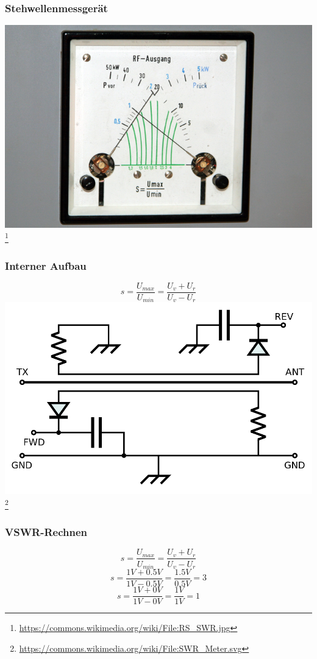 \begin{frame}
    \frametitle{Stehwellenmessgerät}
    \begin{center}
        \includegraphics[width=1\textwidth]{e17/RS_SWR.jpg}
        \footnote{\tiny \url{https://commons.wikimedia.org/wiki/File:RS_SWR.jpg}}
	\end{center}
\end{frame}

\begin{frame}
    \frametitle{Interner Aufbau}
    \begin{center}
    $$s = \frac{U_{max}}{U_{min}} = \frac{U_v + U_r}{U_v - U_r}$$
        \includegraphics[width=.8\textwidth]{e17/SWRMeterInnen.png}
        \footnote{\tiny \url{https://commons.wikimedia.org/wiki/File:SWR_Meter.svg}}
	\end{center}
\end{frame}

\begin{frame}
    \frametitle{VSWR-Rechnen}
    \begin{center}
    $$s = \frac{U_{max}}{U_{min}} = \frac{U_v + U_r}{U_v - U_r}$$
    $$s = \frac{1V + 0.5V}{1V - 0.5V} = \frac{1.5V}{0.5V} = 3$$
	$$s = \frac{1V + 0V}{1V - 0V} = \frac{1V}{1V} = 1$$
	\end{center}
\end{frame}

